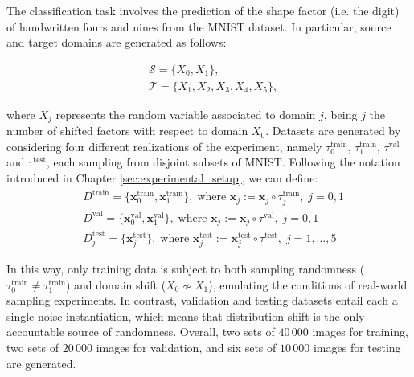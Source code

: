 \begin{definition}\label{def:shifted_factors_experiment}
    The classification task involves the prediction of the shape factor (i.e. the digit)
    of handwritten fours and nines from the MNIST dataset. In particular, source and target
    domains are generated as follows:

    $$
    \begin{aligned}
        &\mathcal{S} = \{ X_0, X_1\},\\
        &\mathcal{T} = \{ X_1, X_2, X_3, X_4, X_5\},
    \end{aligned}
    $$

    where $X_j$ represents the random variable associated to domain $j$, 
    being $j$ the number of shifted factors with respect to domain $X_0$. 
    Datasets are generated by considering
    four different realizations of the experiment, namely $\tau_0^{\text{train}}$, $\tau_1^{\text{train}}$, $\tau^{\text{val}}$
    and $\tau^{\text{test}}$, each sampling from disjoint subsets of MNIST. Following the notation introduced
    in Chapter \ref{sec:experimental_setup}, we can define:
    $$
    \begin{aligned}
        &D^{\text{train}} = \{\bm{x}_0^{\text{train}}, \bm{x}_1^{\text{train}}\}, \; \text{where } \bm{x}_j := \bm{x}_j \circ \tau_j^{\text{train}}, \;j = 0,1 \\
        &D^{\text{val}} = \{\bm{x}_0^{\text{val}}, \bm{x}_1^{\text{val}}\}, \; \text{where } \bm{x}_j := \bm{x}_j \circ \tau^{\text{val}}, \;j=0,1 \\
        &D_j^{\text{test}} = \{\bm{x}_j^{\text{test}}\}, \; \text{where } \bm{x}_j^{\text{test}} := \bm{x}_j^{\text{test}} \circ \tau^{\text{test}}, \;j = 1,\dots,5
    \end{aligned}
    $$

    In this way, only training data is subject to both sampling randomness ($\tau_0^{\text{train}} \neq \tau_1^{\text{train}}$)
    and domain shift ($X_0 \nsim X_1$), emulating the conditions of real-world sampling experiments.
    In contrast, validation and testing datasets entail each a single noise instantiation, 
    which means that distribution shift is the only accountable source of randomness.
    Overall, two sets of $40\,000$ images for training, two sets of $20\,000$ 
    images for validation, and six sets of $10\,000$ images for testing are generated. 
\end{definition}

